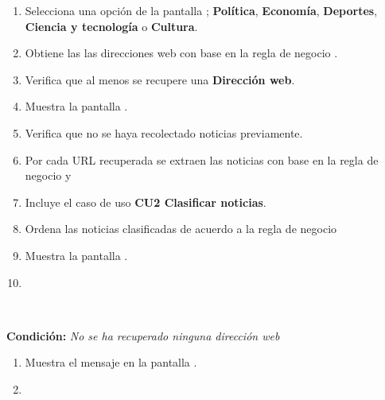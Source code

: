 \begin{enumerate}[1.]

	
	\item \actor Selecciona una opción de la pantalla ; \textbf{Política}, \textbf{Economía}, \textbf{Deportes}, \textbf{Ciencia y tecnología} o \textbf{Cultura}. 
	
	\item \sistema Obtiene las las direcciones web con base en la regla de negocio .
	
	\item \sistema Verifica que al menos se recupere una \textbf{Dirección web}.

	\item \sistema Muestra la pantalla . 	

	\item \sistema Verifica que no se haya recolectado noticias previamente. 

	\item \sistema Por cada URL recuperada se extraen las noticias con base en la regla de negocio  y  

	\item \label{CU1:BuscarN}\sistema Incluye el caso de uso \textbf{CU2 Clasificar noticias}.

	\item \sistema Ordena las noticias clasificadas de acuerdo a la regla de negocio 

	\item \sistema \label{CU1:NoticiasR} Muestra la pantalla .

	\item \finCU	

\end{enumerate}



\begin{large}
	\\
\end{large}	
\textbf{Condición:} \textit{No se ha recuperado ninguna dirección web }

\begin{enumerate}[{A-}1.]

	\item \sistema Muestra el mensaje  en la pantalla .

	\item \finCU

\end{enumerate}


